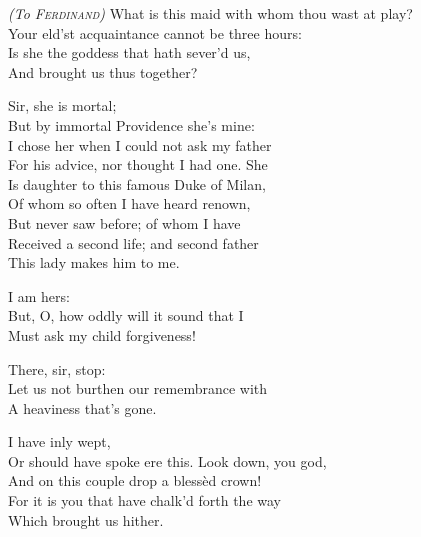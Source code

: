 
\begin{verse_speech}[Alonso] 
\textit{(To \textsc{Ferdinand})} What is this maid with whom thou wast at play?\\
Your eld'st acquaintance cannot be three hours:\\
Is she the goddess that hath sever'd us,\\
And brought us thus together?
\end{verse_speech}

\begin{verse_speech}[Ferdinand] 
Sir, she is mortal;\\
But by immortal Providence she's mine:\\
I chose her when I could not ask my father\\
For his advice, nor thought I had one. She\\
Is daughter to this famous Duke of Milan,\\
Of whom so often I have heard renown,\\
But never saw before; of whom I have\\
Received a second life; and second father\\
This lady makes him to me.
\end{verse_speech}

\begin{verse_speech}[Alonso] 
I am hers:\\
But, O, how oddly will it sound that I\\
Must ask my child forgiveness!
\end{verse_speech}

\begin{verse_speech}[Prospero] 
There, sir, stop:\\
Let us not burthen our remembrance with\\
A heaviness that's gone.
\end{verse_speech}

\begin{verse_speech}[Gonzalo] 
\hspace{\widthof{}}I have inly wept,\\
Or should have spoke ere this. Look down, you god,\\
And on this couple drop a blessèd crown!\\
For it is you that have chalk'd forth the way\\
Which brought us hither.
\end{verse_speech}

